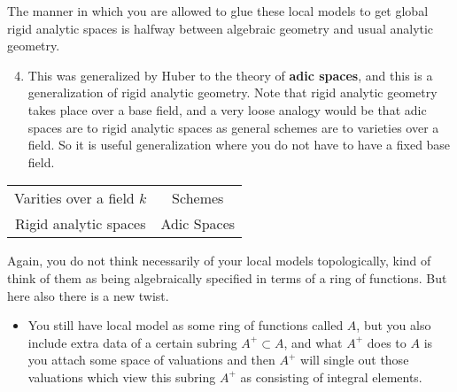 The manner in which you are allowed to glue these local models to get global rigid analytic spaces is halfway between algebraic 
geometry and usual analytic geometry.


\begin{enumerate}
    \setcounter{enumi}{3} 

    \item This was generalized by Huber to the theory of \textbf{adic spaces}, and this is a generalization of rigid analytic 
    geometry. Note that rigid analytic geometry takes place over a base field, and a very loose analogy would be that adic spaces 
    are to rigid analytic spaces as general schemes are to varieties over a field. So it is useful generalization where you do not 
    have to have a fixed base field.
\end{enumerate}

\begin{center}
\begin{tabular}{ |c|c| } 
 \hline
 Varities over a field $k$ & Schemes \\ 
 Rigid analytic spaces & Adic Spaces \\ 

 \hline
\end{tabular}
\end{center}


Again, you do not think necessarily of your local models topologically, kind of think of them as being algebraically specified in 
terms of a ring of functions. But here also there is a new twist. 

\begin{itemize}
    \item  You still have local model as some ring of functions called $A$, but you also include extra data of a certain 
    subring $A^+ \subset A $, and what $A^{+}$ does to $A$ is you attach some space of valuations and then $A^+$ will single 
    out those valuations which view this subring $A^+$ as consisting of integral elements.
\end{itemize}

